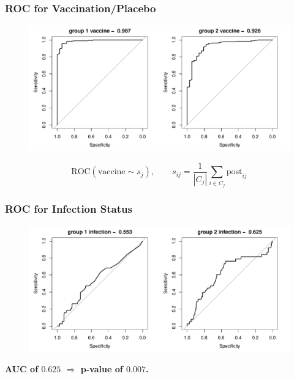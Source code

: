 \documentclass{beamer}
\makeatletter
\def\maxwidth{ %
  \ifdim\Gin@nat@width>\linewidth
    \linewidth
  \else
    \Gin@nat@width
  \fi
}
\theoremstyle{definition}
\makeatother
\begin{document}

\begin{frame}
\frametitle{ROC for Vaccination/Placebo}
\begin{figure}[]
\includegraphics[width= \maxwidth]{figures/rv144ComponentROCvaccine} 
\end{figure}
$$
\text{ROC}(\text{vaccine} \sim s_j), \qquad s_{ij} = \frac{1}{|C_j|}\sum_{i \in C_j} \text{post}_{ij}
$$
\end{frame}


\begin{frame}
\frametitle{ROC for Infection Status} 
\begin{figure}[]
\includegraphics[width= \maxwidth]{figures/RV144componentInfection} 
\end{figure}

\textbf{AUC of $\boldsymbol{0.625}$ $\boldsymbol{\Rightarrow}$ p-value of $\boldsymbol{0.007}$.}
\end{frame}

\end{document}
